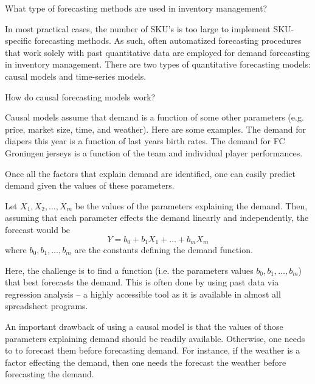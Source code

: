 \begin{exercise}
What type of forecasting methods are used in inventory management?



  \begin{solution}
	In most practical cases, the number of SKU's is too large to implement SKU-specific forecasting methods. As such, often automatized forecasting procedures that work solely with past quantitative data are employed for demand forecasting in inventory management. There are two types of quantitative forecasting models: causal models and time-series models.

   \end{solution}
\end{exercise}
   
\begin{exercise}
How do causal forecasting models work?



  \begin{solution}
    Causal models assume that demand is a function of some other parameters (e.g. price, market size, time, and weather). Here are some examples. The demand for diapers this year is a function of last years birth rates. The demand for FC Groningen jerseys is a function of the team and individual player performances. 

Once all the factors that explain demand are identified, one can easily predict demand given the values of these parameters. 

Let $X_1,X_2,\ldots,X_m$ be the values of the parameters explaining the demand. Then, assuming that each parameter effects the demand linearly and independently, the forecast would be 
\begin{equation*}
Y = b_0 + b_1 X_1 + \ldots + b_m X_m
\end{equation*}
where $b_0,b_1,\ldots,b_m$ are the constants defining the demand function. 

Here, the challenge is to find a function (i.e. the parameters values $b_0,b_1,\ldots,b_m$) that best forecasts the demand. This is often done by using past data via regression analysis -- a highly accessible tool as it is available in almost all spreadsheet programs. 

An important drawback of using a causal model is that the values of those parameters explaining demand should be readily available. Otherwise, one needs to to forecast them before forecasting demand. For instance, if the weather is a factor effecting the demand, then one needs the forecast the weather before forecasting the demand.    

  \end{solution}
\end{exercise}


